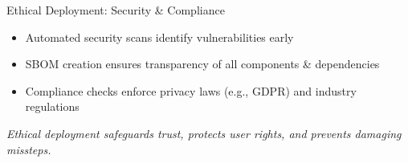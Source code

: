 \documentclass[aspectratio=169]{beamer}
\begin{document}
%
%
\begin{frame}{Ethical Deployment: Security \& Compliance}
\begin{itemize}
\item Automated security scans identify vulnerabilities early
\item SBOM creation ensures transparency of all components \& dependencies
\item Compliance checks enforce privacy laws (e.g., GDPR) and industry regulations
\end{itemize}

\vspace{0.8em}
\emph{Ethical deployment safeguards trust, protects user rights, and prevents damaging missteps.}

\end{frame}
\end{document}
